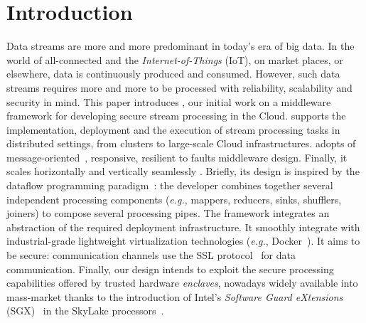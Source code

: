 \section{Introduction}
\label{sec:introduction}

Data streams are more and more predominant in today's era of big data.
In the world of all-connected and the \emph{Internet-of-Things} (IoT), on market places, or elsewhere, data is continuously produced and consumed.
However, such data streams requires more and more to be processed with reliability, scalability and security in mind.
This paper introduces \SYS{}, our initial work on a middleware framework for developing secure stream processing in the Cloud.
\SYS{} supports the implementation, deployment and the execution of stream processing tasks in distributed settings, from clusters to large-scale Cloud infrastructures.
\SYS{} adopts of message-oriented~\cite{mom}, responsive, resilient to faults middleware design.
Finally, it scales horizontally and vertically seamlessly .
Briefly, its design is inspired by the dataflow programming paradigm~\cite{uustalu_essence_2005}: the developer combines together several independent processing components (\emph{e.g.}, mappers, reducers, sinks, shufflers, joiners) to compose several processing pipes.%
The framework integrates an abstraction of the required deployment infrastructure.
It smoothly integrate with industrial-grade lightweight virtualization technologies (\emph{e.g.}, Docker~\cite{docker}).
It aims to be secure: communication channels use the SSL protocol~\cite{freier2011secure} for data communication.
Finally, our design intends to exploit the secure processing capabilities offered by trusted hardware \emph{enclaves}, nowadays widely available into mass-market thanks to the introduction of Intel's \emph{Software Guard eXtensions} (SGX)~\cite{costan_intel} in the SkyLake processors~\cite{skylake}.

